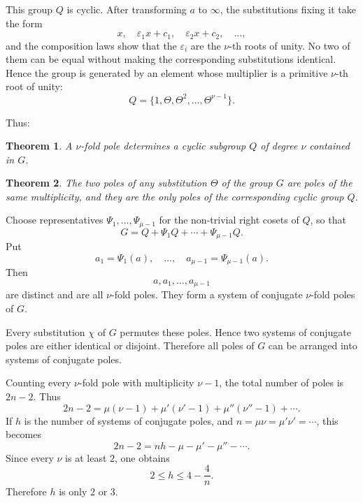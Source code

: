 \documentclass[11pt]{article}
\newtheorem*{theorem*}{Theorem}
\begin{document}
This group $Q$ is cyclic.  After transforming $a$ to $\infty$, the substitutions fixing it take the form
\[
 x,
 \quad \varepsilon_1x+c_1,
 \quad \varepsilon_2x+c_2,
 \quad\ldots,
\]
and the composition laws show that the $\varepsilon_i$ are the $\nu$-th roots of unity.  No two of them can be equal without making the corresponding substitutions identical.  Hence the group is generated by an element whose multiplier is a primitive $\nu$-th root of unity:
\begin{equation}\label{eq:w9-Q-cyclic}
 Q=\{1,\Theta,\Theta^2,\ldots,\Theta^{\nu-1}\}.
\end{equation}

Thus:

\begin{theorem*}
A $\nu$-fold pole determines a cyclic subgroup $Q$ of degree $\nu$ contained in $G$.
\end{theorem*}

\begin{theorem*}
The two poles of any substitution $\Theta$ of the group $G$ are poles of the same multiplicity, and they are the only poles of the corresponding cyclic group $Q$.
\end{theorem*}

Choose representatives $\Psi_1,\ldots,\Psi_{\mu-1}$ for the non-trivial right cosets of $Q$, so that
\begin{equation}\label{eq:w9-cosets}
 G=Q+\Psi_1Q+\cdots+\Psi_{\mu-1}Q.
\end{equation}
Put
\begin{equation}\label{eq:w9-conj-poles}
 a_1=\Psi_1(a),\quad\ldots,\quad a_{\mu-1}=\Psi_{\mu-1}(a).
\end{equation}
Then
\[
 a,a_1,\ldots,a_{\mu-1}
\]
are distinct and are all $\nu$-fold poles.  They form a system of conjugate $\nu$-fold poles of $G$.

Every substitution $\chi$ of $G$ permutes these poles.  Hence two systems of conjugate poles are either identical or disjoint.  Therefore all poles of $G$ can be arranged into systems of conjugate poles.

Counting every $\nu$-fold pole with multiplicity $\nu-1$, the total number of poles is $2n-2$.  Thus
\begin{equation}\label{eq:w9-pole-count}
 2n-2=\mu(\nu-1)+\mu'(\nu'-1)+\mu''(\nu''-1)+\cdots.
\end{equation}
If $h$ is the number of systems of conjugate poles, and $n=\mu\nu=\mu'\nu'=\cdots$, this becomes
\begin{equation}\label{eq:w9-h-count}
 2n-2=nh-\mu-\mu'-\mu''-\cdots.
\end{equation}
Since every $\nu$ is at least $2$, one obtains
\[
 2\le h\le 4-\frac4n.
\]
Therefore $h$ is only $2$ or $3$.
\end{document}
